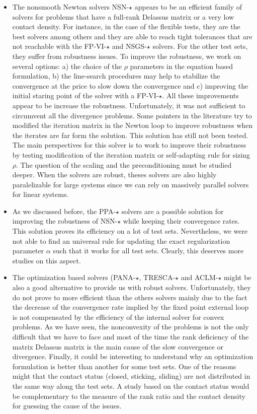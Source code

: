 \begin{itemize}
\item The nonsmooth Newton solvers {\sf NSN-$\star$} appears to be an efficient family of solvers for problems that have a full-rank Delassus matrix or a very low contact density. For instance, in the case of the flexible tests, they are the best solvers among others and they are able to reach tight tolerances that are not reachable with the {\sf FP-VI-$\star$}  and {\sf NSGS-$\star$} solvers. For the other test sets, they suffer from robustness issues. To improve the robustness, we work on several options:  a) the choice of the $\rho$ parameters in the equation based formulation, b) the line-search procedures may help to stabilize the convergence at the price to slow down the convergence and c) improving the initial staring point of the solver with a {\sf FP-VI-$\star$}. All these improvements appear to be increase the robustness. Unfortunately, it was not sufficient to circumvent all the divergence problems. Some pointers in the literature try to modified the iteration matrix in the Newton loop to improve robustness when the iterates are far form the solution. This solution has still not been tested. The main perspectives for this solver is to work to improve their robustness by testing modification of the iteration matrix or self-adapting rule for sizing $\rho$. The question of the scaling and the preconditioning must be studied deeper. When the solvers are robust, theses solvers are also highly paralelizable for large systems since we can rely on massively parallel solvers for linear systems.

\item As we discussed before, the {\sf PPA-$\star$} solvers are a possible solution for improving the robustness of  {\sf NSN-$\star$} while keeping their convergence rates. This solution proves its efficiency on a lot of test sets. Nevertheless, we were not able to find an universal rule for updating the exact regularization parameter $\alpha$ such that it works for all test sets. Clearly, this deserves more studies  on this aspect.

\item The optimization based solvers ({\sf PANA-$\star$, TRESCA-$\star$ and ACLM-$\star$} might be also a good alternative to provide us with robust solvers. Unfortunately, they do not prove to more efficient than the others solvers mainly due to the fact the decrease of the convergence rate implied by the fixed point external loop is not compensated by the efficiency of the internal solver for convex problems. As we have seen, the nonconvexity of the problems is not the only difficult that we have to face and most of the time the rank deficiency of the matrix Delassus matrix is the main cause of the slow convergence or divergence. Finally, it could be interesting to understand why an optimization formulation is better than another for some test sets. One of the reasons might that the contact status (closed, sticking, sliding) are not distributed in the same  way along the test sets. A study based on the contact status would be complementary to the measure of the rank ratio and the contact density for guessing the cause of the issues.


\end{itemize}




